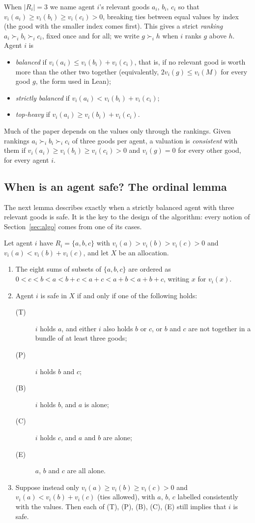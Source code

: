 \documentclass[runningheads,11pt]{llncs}
\begin{document}
When $|R_i|=3$ we name agent $i$'s relevant goods $a_i$, $b_i$, $c_i$ so that $v_i(a_i)\ge v_i(b_i)\ge v_i(c_i)>0$, breaking ties between equal values by index (the good with the smaller index comes first). This gives a strict \emph{ranking} $a_i\succ_i b_i\succ_i c_i$, fixed once and for all; we write $g\succ_i h$ when $i$ ranks $g$ above $h$. Agent $i$ is
\begin{itemize}
\item \emph{balanced} if $v_i(a_i)\le v_i(b_i)+v_i(c_i)$, that is, if no relevant good is worth more than the other two together (equivalently, $2v_i(g)\le v_i(M)$ for every good $g$, the form used in Lean);
\item \emph{strictly balanced} if $v_i(a_i)<v_i(b_i)+v_i(c_i)$;
\item \emph{top-heavy} if $v_i(a_i)\ge v_i(b_i)+v_i(c_i)$.
\end{itemize}
Much of the paper depends on the values only through the rankings. Given rankings $a_i\succ_i b_i\succ_i c_i$ of three goods per agent, a valuation is \emph{consistent} with them if $v_i(a_i)\ge v_i(b_i)\ge v_i(c_i)>0$ and $v_i(g)=0$ for every other good, for every agent $i$.

\subsection{When is an agent safe? The ordinal lemma}\label{sec:L5}

The next lemma describes exactly when a strictly balanced agent with three relevant goods is safe. It is the key to the design of the algorithm: every notion of Section~\ref{sec:algo} comes from one of its cases.

\begin{lemma}\label{lem:L5}
Let agent $i$ have $R_i=\{a,b,c\}$ with $v_i(a)>v_i(b)>v_i(c)>0$ and $v_i(a)<v_i(b)+v_i(c)$, and let $X$ be an allocation.
\begin{enumerate}
\item[(i)] The eight sums of subsets of $\{a,b,c\}$ are ordered as $0<c<b<a<b+c<a+c<a+b<a+b+c$, writing $x$ for $v_i(x)$.
\item[(ii)] Agent $i$ is safe in $X$ if and only if one of the following holds:
\begin{description}
\item[(T)] $i$ holds $a$, and either $i$ also holds $b$ or $c$, or $b$ and $c$ are not together in a bundle of at least three goods;
\item[(P)] $i$ holds $b$ and $c$;
\item[(B)] $i$ holds $b$, and $a$ is alone;
\item[(C)] $i$ holds $c$, and $a$ and $b$ are alone;
\item[(E)] $a$, $b$ and $c$ are all alone.
\end{description}
\item[(iii)] Suppose instead only $v_i(a)\ge v_i(b)\ge v_i(c)>0$ and $v_i(a)<v_i(b)+v_i(c)$ (ties allowed), with $a$, $b$, $c$ labelled consistently with the values. Then each of (T), (P), (B), (C), (E) still implies that $i$ is safe.
\end{enumerate}
\end{lemma}
\end{document}
